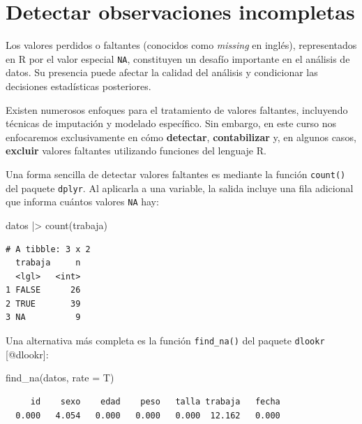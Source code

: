 \documentclass[
  spanish,
  letterpaper,
  DIV=11,
  numbers=noendperiod]{scrreprt}
\newenvironment{Shaded}{\begin{snugshade}}{\end{snugshade}}
\newcommand{\AttributeTok}[1]{\textcolor[rgb]{0.40,0.45,0.13}{#1}}
\newcommand{\FunctionTok}[1]{\textcolor[rgb]{0.28,0.35,0.67}{#1}}
\newcommand{\NormalTok}[1]{\textcolor[rgb]{0.00,0.23,0.31}{#1}}
\newcommand{\SpecialCharTok}[1]{\textcolor[rgb]{0.37,0.37,0.37}{#1}}
\begin{document}
\section{Detectar observaciones
incompletas}\label{detectar-observaciones-incompletas}

Los valores perdidos o faltantes (conocidos como \emph{missing} en
inglés), representados en R por el valor especial \texttt{NA},
constituyen un desafío importante en el análisis de datos. Su presencia
puede afectar la calidad del análisis y condicionar las decisiones
estadísticas posteriores.

Existen numerosos enfoques para el tratamiento de valores faltantes,
incluyendo técnicas de imputación y modelado específico. Sin embargo, en
este curso nos enfocaremos exclusivamente en cómo \textbf{detectar},
\textbf{contabilizar} y, en algunos casos, \textbf{excluir} valores
faltantes utilizando funciones del lenguaje R.

Una forma sencilla de detectar valores faltantes es mediante la función
\texttt{count()} del paquete \texttt{dplyr}. Al aplicarla a una
variable, la salida incluye una fila adicional que informa cuántos
valores \texttt{NA} hay:

\begin{Shaded}
\begin{Highlighting}[]
\NormalTok{datos }\SpecialCharTok{|\textgreater{}}
  \FunctionTok{count}\NormalTok{(trabaja)}
\end{Highlighting}
\end{Shaded}

\begin{verbatim}
# A tibble: 3 x 2
  trabaja     n
  <lgl>   <int>
1 FALSE      26
2 TRUE       39
3 NA          9
\end{verbatim}

Una alternativa más completa es la función \texttt{find\_na()} del
paquete \texttt{dlookr} {[}@dlookr{]}:

\begin{Shaded}
\begin{Highlighting}[]
\FunctionTok{find\_na}\NormalTok{(datos, }\AttributeTok{rate =}\NormalTok{ T)}
\end{Highlighting}
\end{Shaded}

\begin{verbatim}
     id    sexo    edad    peso   talla trabaja   fecha 
  0.000   4.054   0.000   0.000   0.000  12.162   0.000 
\end{verbatim}
\end{document}
